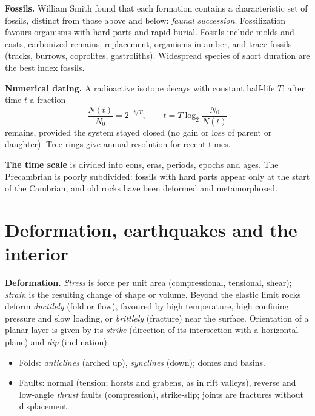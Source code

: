 \textbf{Fossils.} William Smith found that
each formation contains a characteristic
set of fossils, distinct from those above
and below: \emph{faunal succession}.
Fossilization favours organisms with hard
parts and rapid burial. Fossils include
molds and casts, carbonized remains,
replacement, organisms in amber, and trace
fossils (tracks, burrows, coprolites,
gastroliths). Widespread species of short
duration are the best index fossils.

\textbf{Numerical dating.} A radioactive
isotope decays with constant half-life
$T$: after time $t$ a fraction
$$
\frac{N(t)}{N_0} = 2^{-t/T},
\qquad
t = T\log_2\frac{N_0}{N(t)}
$$
remains, provided the system stayed closed
(no gain or loss of parent or daughter).
Tree rings give annual resolution for
recent times.

\textbf{The time scale} is divided into
eons, eras, periods, epochs and ages. The
Precambrian is poorly subdivided: fossils
with hard parts appear only at the start
of the Cambrian, and old rocks have been
deformed and metamorphosed.

\section{Deformation, earthquakes and the
interior}
\label{section-earthquakes-interior}

\textbf{Deformation.} \emph{Stress} is force
per unit area (compressional, tensional,
shear); \emph{strain} is the resulting
change of shape or volume. Beyond the
elastic limit rocks deform
\emph{ductilely} (fold or flow), favoured by
high temperature, high confining pressure
and slow loading, or \emph{brittlely}
(fracture) near the surface. Orientation of
a planar layer is given by its
\emph{strike} (direction of its
intersection with a horizontal plane) and
\emph{dip} (inclination).
\begin{itemize}
\item Folds: \emph{anticlines} (arched up),
\emph{synclines} (down); domes and basins.
\item Faults: normal (tension; horsts and
grabens, as in rift valleys), reverse and
low-angle \emph{thrust} faults
(compression), strike-slip; joints are
fractures without displacement.
\end{itemize}

